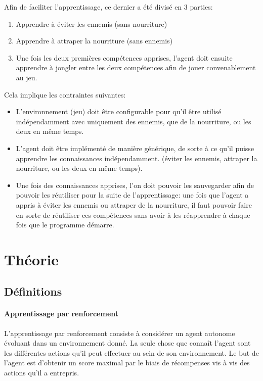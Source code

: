 \documentclass[11pt,a4paper]{report}
\begin{document}
  \par Afin de faciliter l'apprentissage, ce dernier a été divisé en 3 parties: 
  
  \begin{enumerate} 
  \item Apprendre à éviter les ennemis (sans nourriture)
  \item Apprendre à attraper la nourriture (sans ennemis)
  \item Une fois les deux premières compétences apprises, l'agent doit ensuite apprendre à jongler entre les deux compétences afin de jouer convenablement au jeu. 
  \end{enumerate}
  
  \par Cela implique les contraintes suivantes: 
  
  \begin{itemize}
  \item L'environnement (jeu) doit être configurable pour qu'il être utilisé indépendamment avec uniquement des ennemis, que de la nourriture, ou les deux en même temps. 
  \item L'agent doit être implémenté de manière générique, de sorte à ce qu'il puisse apprendre les connaissances indépendamment. (éviter les ennemis, attraper la nourriture, ou les deux en même temps). 
  \item Une fois des connaissances apprises, l'on doit pouvoir les sauvegarder afin de pouvoir les réutiliser pour la suite de l'apprentissage: une fois que l'agent a appris à éviter les ennemis ou attraper de la nourriture, il faut pouvoir faire en sorte de réutiliser ces compétences sans avoir à les réapprendre à chaque fois que le programme démarre. 
  \end{itemize}
  
  \chapter{Théorie}
  
  \section{Définitions}
  
  \subsubsection{Apprentissage par renforcement}  
  
    \par L'apprentissage par renforcement consiste à considérer un agent autonome évoluant dans un environnement donné. La seule chose que connaît l'agent sont les différentes actions qu'il peut effectuer au sein de son environnement. Le but de l'agent est d'obtenir un score maximal par le biais de récompenses vis à vis des actions qu'il a entrepris.
    
\end{document}
